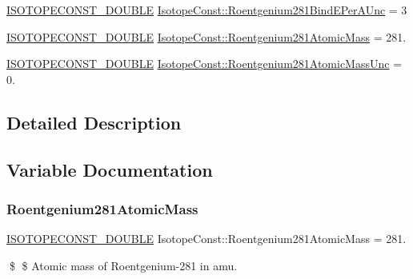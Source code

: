 \begin{DoxyCompactItemize}
\item 
\mbox{\hyperlink{group___isotope_const-_macros_ga8f45a7272ce02c0b4c65c44636ed719a}{I\+S\+O\+T\+O\+P\+E\+C\+O\+N\+S\+T\+\_\+\+D\+O\+U\+B\+LE}} \mbox{\hyperlink{group___isotope_const-_roentgenium-_rg281_ga11a3ccbc4131a3afcd54b323461c0257}{Isotope\+Const\+::\+Roentgenium281\+Bind\+E\+Per\+A\+Unc}} = 3
\item 
\mbox{\hyperlink{group___isotope_const-_macros_ga8f45a7272ce02c0b4c65c44636ed719a}{I\+S\+O\+T\+O\+P\+E\+C\+O\+N\+S\+T\+\_\+\+D\+O\+U\+B\+LE}} \mbox{\hyperlink{group___isotope_const-_roentgenium-_rg281_gacb8ba1cb05cb31649ccbec4718c6c654}{Isotope\+Const\+::\+Roentgenium281\+Atomic\+Mass}} = 281.
\item 
\mbox{\hyperlink{group___isotope_const-_macros_ga8f45a7272ce02c0b4c65c44636ed719a}{I\+S\+O\+T\+O\+P\+E\+C\+O\+N\+S\+T\+\_\+\+D\+O\+U\+B\+LE}} \mbox{\hyperlink{group___isotope_const-_roentgenium-_rg281_ga342b2378fc70bf06c10c9915c7e26b0e}{Isotope\+Const\+::\+Roentgenium281\+Atomic\+Mass\+Unc}} = 0.
\end{DoxyCompactItemize}


\subsection{Detailed Description}


\subsection{Variable Documentation}
\mbox{\label{group___isotope_const-_roentgenium-_rg281_gacb8ba1cb05cb31649ccbec4718c6c654}} 
\subsubsection{\texorpdfstring{Roentgenium281\+Atomic\+Mass}{Roentgenium281AtomicMass}}
{\footnotesize\ttfamily \mbox{\hyperlink{group___isotope_const-_macros_ga8f45a7272ce02c0b4c65c44636ed719a}{I\+S\+O\+T\+O\+P\+E\+C\+O\+N\+S\+T\+\_\+\+D\+O\+U\+B\+LE}} Isotope\+Const\+::\+Roentgenium281\+Atomic\+Mass = 281.}

\$ \$ Atomic mass of Roentgenium-\/281 in amu. \mbox{\label{group___isotope_const-_roentgenium-_rg281_ga342b2378fc70bf06c10c9915c7e26b0e}} 
